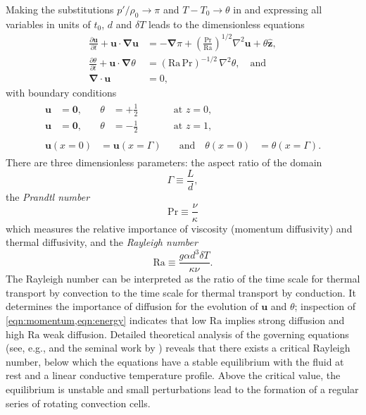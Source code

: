 \documentclass[titlepage]{article}
\numberwithin{equation}{section}
\newcommand{\pdiff}[2]{\frac{\partial #1}{\partial #2}}
\renewcommand\vec{\bm}
\newcommand{\uvec}[1]{\vec{\hat{#1}}}
\newcommand{\grad}{\vec{\nabla}}
\newcommand{\prandtl}{\ensuremath{\mathrm{Pr}}}
\newcommand{\rayleigh}{\ensuremath{\mathrm{Ra}}}
\begin{document}
Making the substitutions $p'/\rho_0 \to \pi$ and $T - T_0 \to \theta$
in  and expressing all
variables in units of $t_0$, $d$ and $\delta T$ leads to the dimensionless
equations
\begin{align}
    \label{eqn:momentum}
    \pdiff{\vec{u}}{t} + \vec{u} \cdot \grad \vec{u}
        &= -\grad \pi + \left( \frac{\prandtl}{\rayleigh}\right)^{1/2}
        \nabla^2 \vec{u} + \theta \uvec{z}, \\
    \label{eqn:energy}
    \pdiff{\theta}{t} + \vec{u} \cdot \grad \theta
        &= (\rayleigh\,\prandtl)^{-1/2} \, \nabla^2 \theta, \quad \text{and} \\
    \label{eqn:incompressible}
    \grad \cdot \vec{u} &= 0,
\end{align}
with boundary conditions
\begin{gather}
\begin{alignat}{3}
    \label{eqn:bc_bot}
    \vec{u} &= \vec{0}, &\quad \theta &= +\frac{1}{2}
    &\qquad& \text{at } z = 0, \\
    \label{eqn:bc_top}
    \vec{u} &= \vec{0}, &\quad \theta &= -\frac{1}{2}
    &\qquad& \text{at } z = 1,
\end{alignat} \\
\begin{alignat}{2}
    \label{eqn:bc_sides}
    \vec{u}(x=0) &= \vec{u}(x=\Gamma)
    &\quad \text{and} \quad \theta(x=0) &= \theta(x=\Gamma).
\end{alignat}
\end{gather}
There are three dimensionless parameters: the aspect ratio of the domain
\[
    \Gamma \equiv \frac{L}{d},
\]
the \emph{Prandtl number}
\[
    \prandtl \equiv \frac{\nu}{\kappa}
\]
which measures the relative importance of viscosity (momentum diffusivity)
and thermal diffusivity, and the \emph{Rayleigh number}
\[
    \rayleigh \equiv \frac{g \alpha d^3 \delta T}{\kappa \nu}.
\]
The Rayleigh number can be interpreted as the ratio of the time scale
for thermal transport by convection to the time scale for thermal
transport by conduction. It determines the importance of diffusion for
the evolution of $\vec{u}$ and $\theta$; inspection of
\cref{eqn:momentum,eqn:energy} indicates that low $\rayleigh$ implies
strong diffusion and high $\rayleigh$ weak diffusion. Detailed
theoretical analysis of the governing equations (see, e.g.,
\textcite{chandrasekhar1961} and the seminal work by
\textcite{rayleigh1916}) reveals that there exists a critical Rayleigh
number, below which the equations have a stable equilibrium with the
fluid at rest and a linear conductive temperature profile. Above the
critical value, the equilibrium is unstable and small perturbations lead
to the formation of a regular series of rotating convection cells.
\end{document}
